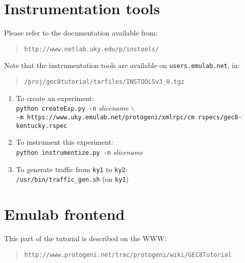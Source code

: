 \documentclass{article}
\begin{document}
\section{Instrumentation tools}
Please refer to the documentation available from:
\begin{quote}{\tt http://www.netlab.uky.edu/p/instools/}\end{quote}
\noindent{}Note that the instrumentation tools are available on {\tt users.emulab.net}, in:
\begin{quote}{\tt /proj/gec8tutorial/tarfiles/INSTOOLSv3\_0.tgz}\end{quote}
\begin{enumerate}
\item To create an experiment:\\
{\tt python createExp.py -n} \emph{slicename} {\tt $\backslash$}\\
{\tt -m https://www.uky.emulab.net/protogeni/xmlrpc/cm
rspecs/gec8-kentucky.rspec}
\item To instrument this experiment:\\
{\tt python instrumentize.py -n} \emph{slicename}
\item To generate traffic from {\tt ky1} to {\tt ky2}:\\
{\tt /usr/bin/traffic\_gen.sh} (on {\tt ky1})
\end{enumerate}

\section{Emulab frontend}
This part of the tutorial is described on the WWW:
\begin{quote}{\tt http://www.protogeni.net/trac/protogeni/wiki/GEC8Tutorial}\end{quote}
\end{document}

